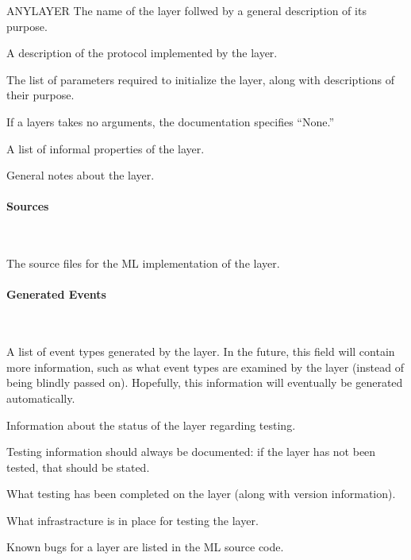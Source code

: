 \begin{Layer}{ANYLAYER}
The name of the layer follwed by a general description of its purpose.

\begin{Protocol}
A description of the protocol implemented by the layer.
\end{Protocol}

\begin{Parameters}
\item The list of parameters required to initialize the layer, along with
descriptions of their purpose.
\item {}
\item If a layers takes no arguments, the documentation specifies
``None.''
\end{Parameters}

\begin{Properties}
\item A list of informal properties of the layer.
\end{Properties}

\begin{Notes}
\item General notes about the layer.
\end{Notes}

\paragraph{Sources} ~\par
The source files for the ML implementation of the layer.

\paragraph{Generated Events} ~\par
A list of event types generated by the layer.  In the future, this field
will contain more information, such as what event types are examined by
the layer (instead of being blindly passed on).  Hopefully, this
information will eventually be generated automatically.

\begin{Testing}
\item Information about the status of the layer regarding testing.
\item Testing information should always be documented: if the layer has
  not been tested, that should be stated.
\item What testing has been completed on the layer (along with version
  information).
\item What infrastracture is in place for testing the layer.
\item Known bugs for a layer are listed in the ML source code.
\end{Testing}
\end{Layer}

